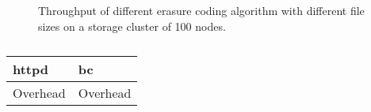 \begin{figure}
    \centering
    
    \caption{Throughput of different erasure coding algorithm with different file sizes on a storage cluster of 100 nodes.}
    \label{fig:throughput-plot}
\end{figure}

\begin{figure}
    \centering
    \caption{}
    \label{fig:latency-plot}
\end{figure}

\begin{table}
    \centering
    \begin{tabular}{ll}
        \toprule
        httpd & bc \\
        \midrule
        Overhead & Overhead \\
        \bottomrule
    \end{tabular}
    \caption{}
    \label{fig:overhead-table}
\end{table}

\begin{figure*}
    \centering
    \caption{}
    \label{fig:trace-experiment-plot}
\end{figure*}
